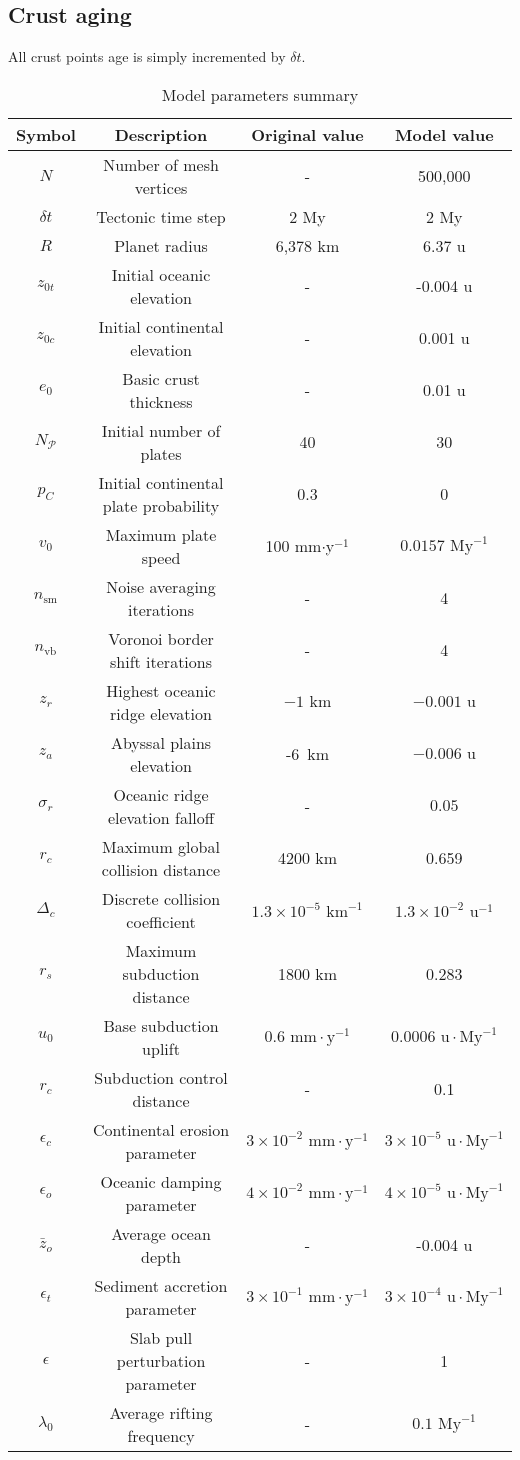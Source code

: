 \subsection{Crust aging}
All crust points age is simply incremented by $\delta t$.
\begin{table}[h]
\centering
\begin{tabular}{cccc}
\textbf{Symbol}&\textbf{Description}&\textbf{Original value}&\textbf{Model value}\\
\hline
$N$&Number of mesh vertices&-&500,000\\
$\delta t$&Tectonic time step&2 My&2 My\\
$R$&Planet radius&6,378 km&6.37 u\\
$z_{0t}$&Initial oceanic elevation&-&-0.004 u\\
$z_{0c}$&Initial continental elevation&-&0.001 u\\
$e_0$&Basic crust thickness&-&0.01 u\\
$N_\mathcal{P}$&Initial number of plates&40&30\\
$p_C$&Initial continental plate probability&0.3&0\\
$v_0$&Maximum plate speed&100 mm$\cdot$y$^{-1}$&$0.0157\mbox{ My}^{-1}$\\
$n_{\mbox{sm}}$&Noise averaging iterations&-&4\\
$n_{\mbox{vb}}$&Voronoi border shift iterations&-&4\\
$z_r$&Highest oceanic ridge elevation&$-1\mbox{ km}$&$-0.001\mbox{ u}$\\
$z_a$&Abyssal plains elevation&-6\mbox{ km}&$-0.006\mbox{ u}$\\
$\sigma_r$&Oceanic ridge elevation falloff&-&$0.05$\\
$r_c$&Maximum global collision distance&4200 km&0.659\\
$\Delta_c$&Discrete collision coefficient&$1.3\times10^{-5}\mbox{ km}^{-1}$&$1.3\times10^{-2}\mbox{ u}^{-1}$\\
$r_s$&Maximum subduction distance&1800 km&0.283\\
$u_0$&Base subduction uplift&$0.6\mbox{ mm}\cdot\mbox{y}^{-1}$&$0.0006\mbox{ u}\cdot\mbox{My}^{-1}$\\
$r_c$&Subduction control distance&-&0.1\\
$\epsilon_c$&Continental erosion parameter&$3\times10^{-2}\mbox{ mm}\cdot\mbox{y}^{-1}$&$3\times10^{-5}\mbox{ u}\cdot\mbox{My}^{-1}$\\
$\epsilon_o$&Oceanic damping parameter&$4\times10^{-2}\mbox{ mm}\cdot\mbox{y}^{-1}$&$4\times10^{-5}\mbox{ u}\cdot\mbox{My}^{-1}$\\
$\bar{z}_o$&Average ocean depth&-&-0.004 u\\
$\epsilon_t$&Sediment accretion parameter&$3\times10^{-1}\mbox{ mm}\cdot\mbox{y}^{-1}$&$3\times10^{-4}\mbox{ u}\cdot\mbox{My}^{-1}$\\
$\epsilon$&Slab pull perturbation parameter&-&1\\
$\lambda_0$&Average rifting frequency&-&$0.1\mbox{ My}^{-1}$\\
\end{tabular}
\caption{Model parameters summary}
\label{tab:model-parameters-summary}
\end{table}